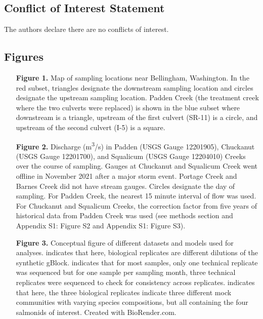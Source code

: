 \documentclass[
]{article}
\begin{document}
\hypertarget{conflict-of-interest-statement}{%
\subsection{Conflict of Interest
Statement}\label{conflict-of-interest-statement}}

The authors declare there are no conflicts of interest.

\newpage

\hypertarget{figures}{%
\subsection{Figures}\label{figures}}

\begin{itemize}
\setlength{\itemindent}{4em}
\item[\textbf{Figure 1.}] Map of sampling locations near Bellingham, Washington. In the red subset, triangles designate the downstream sampling location and circles designate the upstream sampling location. Padden Creek (the treatment creek where the two culverts were replaced) is shown in the blue subset where downstream is a triangle, upstream of the first culvert (SR-11) is a circle, and upstream of the second culvert (I-5) is a square.
\item[\textbf{Figure 2.}] Discharge (m\textsuperscript{3}/s) in Padden (USGS Gauge 12201905), Chuckanut (USGS Gauge 12201700), and Squalicum (USGS Gauge 12204010) Creeks over the course of sampling. Gauges at Chuckanut and Squalicum Creek went offline in November 2021 after a major storm event. Portage Creek and Barnes Creek did not have stream gauges. Circles designate the day of sampling. For Padden Creek, the nearest 15 minute interval of flow was used. For Chuckanut and Squalicum Creeks, the correction factor from five years of historical data from Padden Creek was used (see methods section and Appendix S1: Figure S2 and Appendix S1: Figure S3).
\item[\textbf{Figure 3.}] Conceptual figure of different datasets and models used for analyses. \* indicates that here, biological replicates are different dilutions of the synthetic gBlock. \*\* indicates that for most samples, only one technical replicate was sequenced but for one sample per sampling month, three technical replicates were sequenced to check for consistency across replicates. \*\*\* indicates that here, the three biological replicates indicate three different mock communities with varying species compositions, but all containing the four salmonids of interest. Created with BioRender.com.

\end{itemize}
\end{document}
